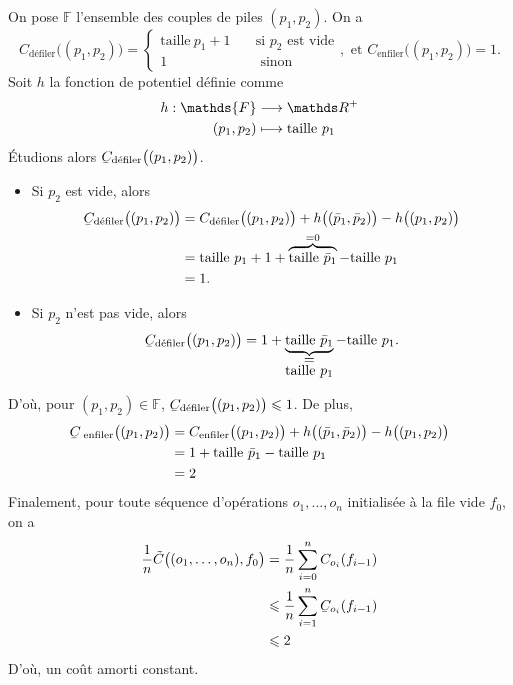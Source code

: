 {{\begin{exm}
			On pose $\mathds{F}$\/ l'ensemble des couples de piles $(p_1, p_2)$.
			On a \[
				C_\text{défiler}\big((p_1, p_2)\big) = \begin{cases}
					\mathrm{taille}\ p_1 + 1 \quad& \text{si $p_2$ est vide}\\
					1 \quad& \text{ sinon}
				\end{cases}, \text{ et } C_\text{enfiler}\big((p_1, p_2)\big) = 1
			.\] Soit $h$\/ la fonction de potentiel définie comme \begin{align*}
				h: \mathds{F} &\longrightarrow \R^+ \\
				(p_1, p_2) &\longmapsto \mathrm{taille}\ p_1
			\end{align*}
			Étudions alors $\ubar{C}_\text{défiler}\big((p_1, p_2)\big)$.
			\begin{itemize}
				\item Si $p_2$\/ est vide, alors
					\begin{align*}
						\ubar{C}_\text{défiler}\big((p_1, p_2)\big) &= C_\text{défiler}\big((p_1,p_2)\big) + h\big((\bar{p}_1, \bar{p}_2)\big) - h\big((p_1, p_2)\big)\\
						&= \mathrm{taille} \ p_1 + 1 + \overbrace{\mathrm{taille}\ \bar{p}_1}^{=0} - \mathrm{taille}\ p_1 \\
						&= 1.
					\end{align*}
				\item Si $p_2$\/ n'est pas vide, alors \[
						\ubar{C}_\text{défiler}\big((p_1, p_2)\big) = 1 + \underbrace{\mathrm{taille}\  \bar{p}_1}_{\substack{\ds=\\ \ds \mathrm{taille}\ p_1}} - \mathrm{taille}\ p_1
					.\]
			\end{itemize}
			D'où, pour $(p_1, p_2) \in \mathds{F}$, $\ubar{C}_ \text{défiler}\big((p_1, p_2)\big) \le 1$.
			De plus,
			\begin{align*}
				\ubar{C}_ \text{ enfiler}\big((p_1, p_2)\big)
				&= C_ \text{enfiler}\big((p_1, p_2)\big) + h\big((\bar{p}_1, \bar{p}_2)\big) - h\big((p_1, p_2)\big) \\
				&= 1 + \mathrm{taille}\ \bar{p}_1 - \mathrm{taille}\ p_1 \\
				&= 2 \\
			\end{align*}
			Finalement, pour toute séquence d'opérations $o_1, \ldots, o_n$\/ initialisée à la file vide $f_0$, on a
			\begin{align*}
				\frac{1}{n} \tilde C\big((o_1,\ldots,o_n), f_0\big)
				&= \frac{1}{n} \sum_{i=0}^n C_{o_i}(f_{i-1}) \\
				&\le \frac{1}{n} \sum_{i=1}^n \ubar{C}_{o_i}(f_{i-1}) \\
				&\le 2
			\end{align*}
			D'où, un coût amorti constant.
		\end{exm}
	}
	\def\addmacros#1{#1}
}
